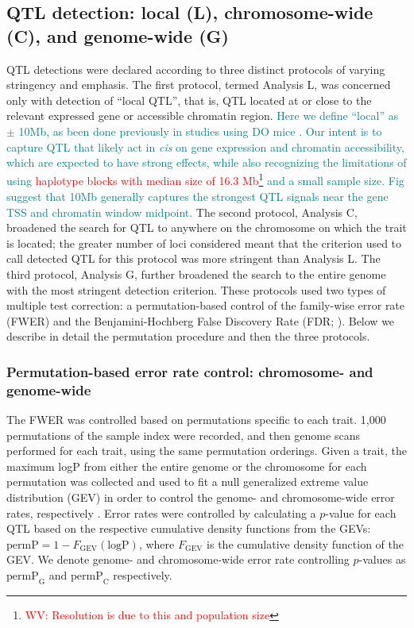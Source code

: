 \documentclass[10pt,letterpaper]{article}
\newcommand{\permpc}{\text{permP}_{\text{C}}}
\newcommand{\permpg}{\text{permP}_{\text{G}}}
\newcommand{\WV}[2]{\textcolor{red}{#1\footnote{\textcolor{red}{WV: #2}}}}
\newcommand{\GKinline}[1]{\textcolor{teal}{#1}}
\begin{document}
\subsection*{QTL detection: local (L), chromosome-wide (C), and genome-wide (G)}

QTL detections were declared according to three distinct protocols of varying stringency and emphasis. The first protocol, termed Analysis L, was concerned only with detection of ``local QTL'', that is, QTL located at or close to the relevant expressed gene or accessible chromatin region. \GKinline{Here we define ``local'' as $\pm$ 10Mb, as been done previously in studies using DO mice \cite{Chick2016}. Our intent is to capture QTL that likely act in \textit{cis} on gene expression and chromatin accessibility, which are expected to have strong effects, while also recognizing the limitations of using \WV{haplotype blocks with median size of 16.3 Mb}{Resolution is due to this and population size} \cite{Srivastava2017} and a small sample size. Fig \nameref{S_dist} suggest that 10Mb generally captures the strongest QTL signals near the gene TSS and chromatin window midpoint.}
The second protocol, Analysis C, broadened the search for QTL to anywhere on the chromosome on which the trait is located; the greater number of loci considered meant that the criterion used to call detected QTL for this protocol was more stringent than Analysis L.
The third protocol, Analysis G, further broadened the search to the entire genome with the most stringent detection criterion.
These protocols used two types of multiple test correction: a permutation-based control of the family-wise error rate (FWER) and the Benjamini-Hochberg False Discovery Rate (FDR; \cite{Benjamini1995}). Below we describe in detail the permutation procedure and then the three protocols.

\subsubsection*{Permutation-based error rate control: chromosome- and genome-wide}

The FWER was controlled based on permutations specific to each trait. 1,000 permutations of the sample index were recorded, and then genome scans performed for each trait, using the same permutation orderings. Given a trait, the maximum logP from either the entire genome or the chromosome for each permutation was collected and used to fit a null generalized extreme value distribution (GEV) in order to control the genome- and chromosome-wide error rates, respectively \cite{Dudbridge2004}. 
Error rates were controlled by calculating a $p$-value for each QTL based on the respective cumulative density functions from the GEVs: $\text{permP} = 1 - F_{\text{GEV}}(\text{logP})$, where $F_{\text{GEV}}$ is the cumulative density function of the GEV. We denote genome- and chromosome-wide error rate controlling  $p$-values as $\permpg$ and $\permpc$ respectively.
\end{document}
